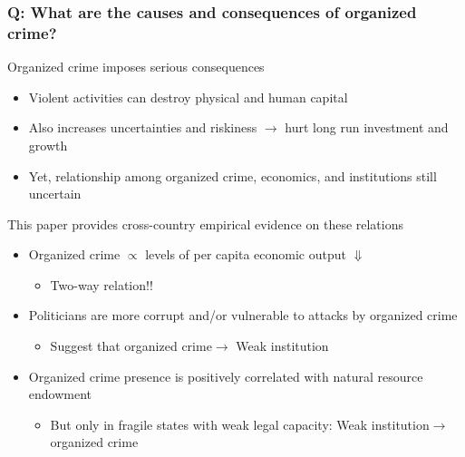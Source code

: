 \documentclass[aspectratio=169]{beamer}
\begin{document}
\begin{frame}
\frametitle{Q: What are the causes and consequences of organized crime?} 
Organized crime imposes serious consequences 
\begin{itemize}\setlength\itemsep{3pt}
\item Violent activities can destroy physical and human capital
\item Also increases uncertainties and riskiness $\to$ hurt long run investment and growth
\item Yet, relationship among organized crime, economics, and institutions still uncertain
\end{itemize} \medskip
This paper provides cross-country empirical evidence on these relations
\begin{itemize}\setlength\itemsep{3pt}
\item Organized crime $\propto $ levels of per capita economic output $\Downarrow$
\begin{itemize}
\item Two-way relation!! 
\end{itemize}
\item Politicians are more corrupt and/or vulnerable to attacks by organized crime
\begin{itemize}
\item Suggest that organized crime$\to$ Weak institution
\end{itemize}
\item Organized crime presence is positively correlated with natural resource endowment
\begin{itemize}
\item But only in fragile states with weak legal capacity: Weak institution$\to$ organized crime
\end{itemize}
\end{itemize}
\end{frame}
\end{document}
